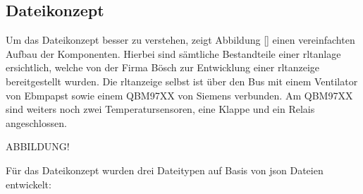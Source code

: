 \subsection{Dateikonzept} \label{json_config_files}
Um das Dateikonzept besser zu verstehen, zeigt Abbildung \ref{} einen vereinfachten Aufbau der Komponenten. Hierbei sind sämtliche Bestandteile einer \acs{rltanlage} ersichtlich, welche von der Firma Bösch zur Entwicklung einer \acs{rltanzeige} bereitgestellt wurden. Die \acs{rltanzeige} selbst ist über den Bus mit einem Ventilator von Ebmpapst sowie einem QBM97XX von Siemens verbunden. Am QBM97XX sind weiters noch zwei Temperatursensoren, eine Klappe und ein Relais angeschlossen.

ABBILDUNG!

Für das Dateikonzept wurden drei Dateitypen auf Basis von \acs{json} Dateien entwickelt:


